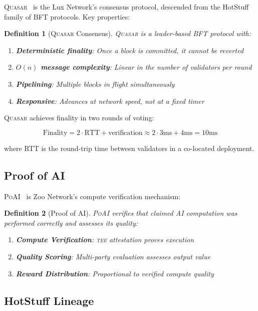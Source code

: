 \documentclass[11pt,letterpaper]{article}
\newtheorem{definition}{Definition}[section]
\newcommand{\PoAI}{\textsc{PoAI}}
\newcommand{\Quasar}{\textsc{Quasar}}
\newcommand{\TEE}{\textsc{tee}}
\begin{document}
\Quasar{}~\cite{lux-quasar-consensus} is the Lux Network's consensus protocol, descended from the HotStuff family of BFT protocols. Key properties:

\begin{definition}[\Quasar{} Consensus]
\Quasar{} is a leader-based BFT protocol with:
\begin{enumerate}
    \item \textbf{Deterministic finality}: Once a block is committed, it cannot be reverted
    \item \textbf{$O(n)$ message complexity}: Linear in the number of validators per round
    \item \textbf{Pipelining}: Multiple blocks in flight simultaneously
    \item \textbf{Responsive}: Advances at network speed, not at a fixed timer
\end{enumerate}
\end{definition}

\Quasar{} achieves finality in two rounds of voting:

\begin{equation}
\text{Finality} = 2 \cdot \text{RTT} + \text{verification} \approx 2 \cdot 3\text{ms} + 4\text{ms} = 10\text{ms}
\end{equation}

where RTT is the round-trip time between validators in a co-located deployment.

\subsection{Proof of AI}

\PoAI{}~\cite{zoo-poai-consensus} is Zoo Network's compute verification mechanism:

\begin{definition}[Proof of AI]
\PoAI{} verifies that claimed AI computation was performed correctly and assesses its quality:
\begin{enumerate}
    \item \textbf{Compute Verification}: \TEE{} attestation proves execution
    \item \textbf{Quality Scoring}: Multi-party evaluation assesses output value
    \item \textbf{Reward Distribution}: Proportional to verified compute quality
\end{enumerate}
\end{definition}

\subsection{HotStuff Lineage}
\end{document}
